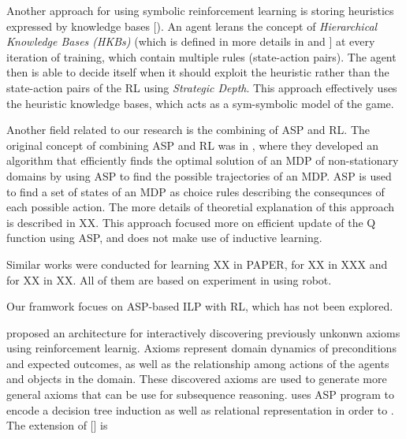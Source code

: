 
Another approach for using symbolic reinforcement learning is storing heuristics expressed by knowledge bases [\cite{Apeldoorn2017}).  
An agent lerans the concept of \textit{Hierarchical Knowledge Bases (HKBs)} (which is defined in more details in \cite{Apeldoorn2016} and \cite{Apeldoorn}] at every iteration of training, which contain multiple rules (state-action pairs). 
The agent then is able to decide itself when it should exploit the heuristic rather than the state-action pairs of the RL using  \textit{Strategic Depth}. 
This approach effectively uses the heuristic knowledge bases, which acts as a sym-symbolic model of the game.

Another field related to our research is the combining of ASP and RL. 
The original concept of combining ASP and RL was in \cite{Ferreira2017}, where they developed an algorithm that efficiently finds the optimal solution of an MDP of non-stationary domains by using ASP to find the possible trajectories of an MDP. 
ASP is used to find a set of states of an MDP as choice rules describing the consequnces of each possible action.
The more details of theoretial explanation of this approach is described in XX.
This approach focused more on efficient update of the Q function using ASP, and does not make use of inductive learning.

Similar works were conducted for learning XX in PAPER, for XX in XXX and for XX in XX. 
All of them are based on experiment in using robot.


Our framwork focues on ASP-based ILP with RL, which has not been explored.


\cite{Meadows2018} proposed an architecture for interactively discovering previously unkonwn axioms using reinforcement learnig.
Axioms represent domain dynamics of preconditions and expected outcomes, as well as the relationship among actions of the agents and objects in the domain.
These discovered axioms are used to generate more general axioms that can be use for subsequence reasoning.
uses ASP program to encode a decision tree induction as well as relational representation in order to . 
The extension of [] is




